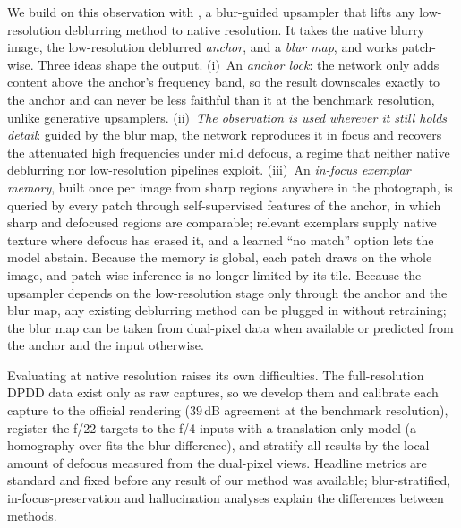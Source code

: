 We build on this observation with \method, a blur-guided upsampler that lifts any low-resolution
deblurring method to native resolution. It takes the native blurry image, the low-resolution
deblurred \emph{anchor}, and a \emph{blur map}, and works patch-wise. Three ideas shape the output.
(i)~An \emph{anchor lock}: the network only adds content above the anchor's frequency band, so the
result downscales exactly to the anchor and can never be less faithful than it at the benchmark
resolution, unlike generative upsamplers. (ii)~\emph{The observation is used wherever it still holds
detail}: guided by the blur map, the network reproduces it in focus and recovers the attenuated high
frequencies under mild defocus, a regime that neither native deblurring nor low-resolution pipelines
exploit. (iii)~An \emph{in-focus exemplar memory}, built once per image from sharp regions anywhere in
the photograph, is queried by every patch through self-supervised features of the anchor, in which
sharp and defocused regions are comparable; relevant exemplars supply native texture where defocus has
erased it, and a learned ``no match'' option lets the model abstain. Because the memory is global, each
patch draws on the whole image, and patch-wise inference is no longer limited by its tile. Because the
upsampler depends on the low-resolution stage only through the anchor and the blur map, any existing
deblurring method can be plugged in without retraining; the blur map can be taken from dual-pixel data
when available or predicted from the anchor and the input otherwise.

Evaluating at native resolution raises its own difficulties. The full-resolution DPDD data exist only
as raw captures, so we develop them and calibrate each capture to the official rendering
($39$\,dB agreement at the benchmark resolution), register the f/22 targets to the f/4 inputs with a
translation-only model (a homography over-fits the blur difference), and stratify all results by the
local amount of defocus measured from the dual-pixel views. Headline metrics are standard and fixed
before any result of our method was available; blur-stratified, in-focus-preservation and
hallucination analyses explain the differences between methods.

